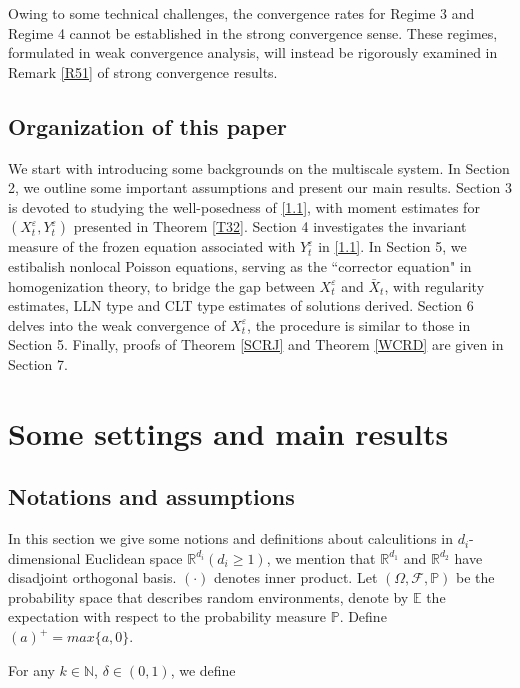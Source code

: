 \documentclass[11pt,reqno]{amsart}
\numberwithin{equation}{section}
\begin{document}
Owing to some technical challenges, the convergence rates for Regime 3 and Regime 4 cannot be established in the ‌strong convergence‌ sense. These regimes, formulated in ‌weak convergence analysis‌, will instead be rigorously examined in Remark \ref{R51} of strong convergence results.


\subsection{Organization of this paper}
We start with introducing some backgrounds on the multiscale system. In Section 2, we outline some important assumptions and present our main results. 
Section 3 is devoted to studying the well-posedness of  \eqref{1.1}, with moment estimates for   $(X^{\varepsilon}_{t},Y^{\varepsilon}_{t})$  presented in Theorem \ref{T32}.  Section 4 investigates the invariant measure of the frozen equation associated with $Y^{\varepsilon}_{t}$ in \eqref{1.1}.
In Section 5, we estibalish  nonlocal Poisson equations, serving as the ``corrector equation" in homogenization theory, to bridge the gap between 
$X^{\varepsilon}_{t}$ and $\bar{X}_{t}$, with regularity estimates, LLN type  and CLT type estimates of solutions derived. 
Section 6 delves into the weak convergence of $X^{\varepsilon}_{t}$, the procedure is similar to those in Section 5. Finally, proofs of Theorem \ref{SCRJ} and Theorem \ref{WCRD} are given in Section 7.





\section{Some settings and main results}

\subsection{Notations and assumptions}
In this section we give some notions and definitions about calculitions in $d_{i}$-dimensional Euclidean space $\mathbb{R}^{d_{i} }(d_{i}\geq 1) $, we mention that  $\mathbb{R}^{d_{1} }$ and $\mathbb{R}^{d_{2} }$ have disadjoint orthogonal basis. 
$( \cdot) $ denotes inner product. Let $(\Omega,\mathcal{F},\mathbb{P})$ be the probability space  that describes random environments, denote by $ \mathbb{E}$ the expectation with respect to the probability measure $\mathbb{P}$. Define $(a)^{+}=max\{a, 0\}$.

For any $ k\in \mathbb{N}$, $\delta\in (0,1)$, we define
\end{document}
